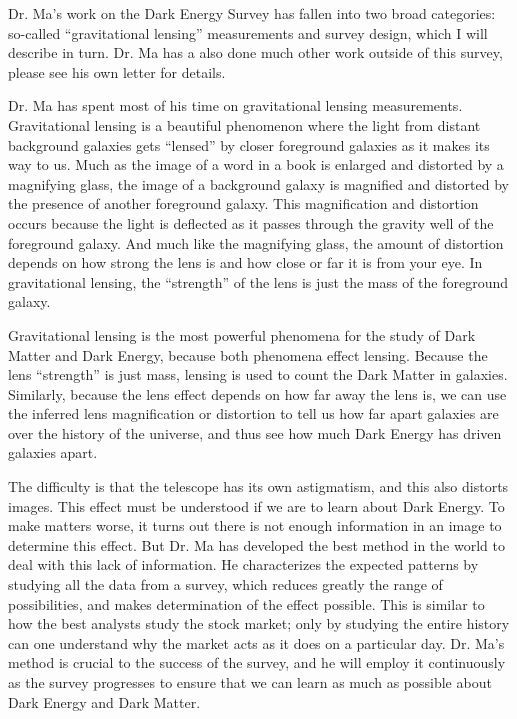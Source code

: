 \documentclass[12pt]{letter}
\begin{document}
Dr. Ma's work on the Dark Energy Survey has fallen into two broad categories:
so-called ``gravitational lensing'' measurements and survey design, which I
will describe in turn.  Dr. Ma has a also done much other work outside
of this survey, please see his own letter for details.

Dr. Ma has spent most of his time on gravitational lensing measurements.
Gravitational lensing is a beautiful phenomenon where the light from distant
background galaxies gets ``lensed'' by closer foreground galaxies as it makes
its way to us.  Much as the image of a word in a book is enlarged and distorted
by a magnifying glass, the image of a background galaxy is magnified and
distorted by the presence of another foreground galaxy.  This magnification and
distortion occurs because the light is deflected as it passes through the
gravity well of the foreground galaxy.  And much like the magnifying glass, the
amount of distortion depends on how strong the lens is and how close or far it
is from your eye.  In gravitational lensing, the ``strength'' of the lens is
just the mass of the foreground galaxy.

Gravitational lensing is the most powerful phenomena for the study of Dark
Matter and Dark Energy, because both phenomena effect lensing.  Because the
lens ``strength'' is just mass, lensing is used to count the Dark Matter in
galaxies.  Similarly, because the lens effect depends on how far away the lens
is, we can use the inferred lens magnification or distortion to tell us how
far apart galaxies are over the history of the universe, and thus see how much
Dark Energy has driven galaxies apart.

The difficulty is that the telescope has its own astigmatism, and this also
distorts images.  This effect must be understood if we are to learn about Dark
Energy.  To make matters worse, it turns out there is not enough information in
an image to determine this effect.  But Dr. Ma has developed the best method in
the world to deal with this lack of information.  He characterizes the expected
patterns by studying all the data from a survey, which reduces greatly the
range of possibilities, and makes determination of the effect possible.  This
is similar to how the best analysts study the stock market; only by studying
the entire history can one understand why the market acts as it does on a
particular day.  Dr. Ma's method is crucial to the success of the survey, and
he will employ it continuously as the survey progresses to ensure that we can
learn as much as possible about Dark Energy and Dark Matter.
\end{document}
